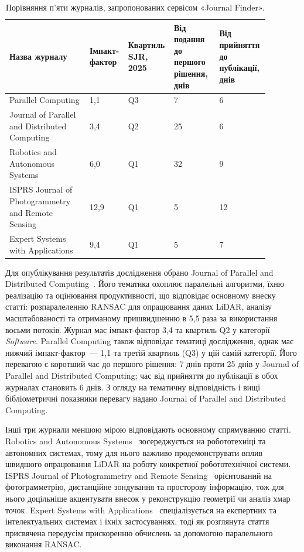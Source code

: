 \documentclass{article}
\begin{document}
\begin{table}[H]
  \caption{Порівняння п'яти журналів, запропонованих сервісом «Journal Finder».}
  \label{tab:journal_comparison}
  \centering
  \begingroup
  \small
  \setlength{\tabcolsep}{4pt}
  \renewcommand{\arraystretch}{1.25}
  \begin{tabular}{|p{0.30\linewidth}|p{0.11\linewidth}|p{0.13\linewidth}|p{0.17\linewidth}|p{0.17\linewidth}|}
    \hline
    \textbf{Назва журналу} & \textbf{Імпакт-фактор} & \textbf{Квартиль SJR, 2025} & \textbf{Від подання до першого рішення, днів} & \textbf{Від прийняття до публікації, днів} \\
    \hline
    Parallel Computing & 1,1 & Q3~\cite{sjr_parallel} & 7 & 6 \\
    \hline
    Journal of Parallel and Distributed Computing & 3,4 & Q2~\cite{sjr_jpdc} & 25 & 6 \\
    \hline
    Robotics and Autonomous Systems & 6,0 & Q1~\cite{sjr_ras} & 32 & 9 \\
    \hline
    ISPRS Journal of Photogrammetry and Remote Sensing & 12,9 & Q1~\cite{sjr_isprs} & 5 & 12 \\
    \hline
    Expert Systems with Applications & 9,4 & Q1~\cite{sjr_eswa} & 5 & 7 \\
    \hline
  \end{tabular}
  \endgroup
\end{table}

Для опублікування результатів дослідження обрано Journal of Parallel and Distributed Computing~\cite{jpdc}. Його тематика охоплює паралельні алгоритми, їхню реалізацію та оцінювання продуктивності, що відповідає основному внеску статті: розпаралеленню RANSAC для опрацювання даних LiDAR, аналізу масштабованості та отриманому пришвидшенню в 5,5 раза за використання восьми потоків. Журнал має імпакт-фактор 3,4 та квартиль Q2 у категорії \textit{Software}. Parallel Computing також відповідає тематиці дослідження, однак має нижчий імпакт-фактор~--- 1,1 та третій квартиль (Q3) у цій самій категорії. Його перевагою є коротший час до першого рішення: 7 днів проти 25 днів у Journal of Parallel and Distributed Computing; час від прийняття до публікації в обох журналах становить 6 днів. З огляду на тематичну відповідність і вищі бібліометричні показники перевагу надано Journal of Parallel and Distributed Computing.

Інші три журнали меншою мірою відповідають основному спрямуванню статті. Robotics and Autonomous Systems~\cite{ras} зосереджується на робототехніці та автономних системах, тому для нього важливо продемонструвати вплив швидшого опрацювання LiDAR на роботу конкретної робототехнічної системи. ISPRS Journal of Photogrammetry and Remote Sensing~\cite{isprs_journal} орієнтований на фотограмметрію, дистанційне зондування та просторову інформацію, тож для нього доцільніше акцентувати внесок у реконструкцію геометрії чи аналіз хмар точок. Expert Systems with Applications~\cite{eswa} спеціалізується на експертних та інтелектуальних системах і їхніх застосуваннях, тоді як розглянута стаття присвячена передусім прискоренню обчислень за допомогою паралельного виконання RANSAC.
\end{document}
